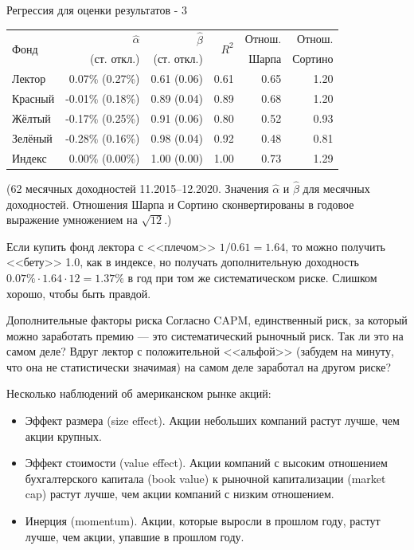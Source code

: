\documentclass{beamer}
\begin{document}
\begin{frame}{Регрессия для оценки результатов - 3}
\center
\begin{tabular}{l|r|r|r|r|r}
\multirow{2}{*}{Фонд}    & $\hat{\alpha}$ & $\hat{\beta}$ & \multirow{2}{*}{$R^2$} & Отнош. & Отнош. \\
& \scriptsize{(ст. откл.)} & \scriptsize{(ст. откл.)} & & Шарпа & Сортино \\ \hline
Лектор  &  0.07\% \scriptsize{(0.27\%)} & 0.61 \scriptsize{(0.06)}   &  0.61 & 0.65 & 1.20 \\
Красный & -0.01\% \scriptsize{(0.18\%)} & 0.89 \scriptsize{(0.04)}   &  0.89 & 0.68 & 1.20 \\
Жёлтый  & -0.17\% \scriptsize{(0.25\%)} & 0.91 \scriptsize{(0.06)}   &  0.80 & 0.52 & 0.93 \\
Зелёный & -0.28\% \scriptsize{(0.16\%)} & 0.98 \scriptsize{(0.04)}   &  0.92 & 0.48 & 0.81 \\ \hline
Индекс  & 0.00\% \scriptsize{(0.00\%)}  & 1.00 \scriptsize{(0.00)}   &  1.00 & 0.73 & 1.29
\end{tabular}
\justify
{\scriptsize(62 месячных доходностей 11.2015--12.2020. Значения $\hat{\alpha}$ и $\hat{\beta}$ для месячных доходностей. Отношения Шарпа и Сортино сконвертированы в годовое выражение умножением на $\sqrt{12}$.)}

\justify
Если купить фонд лектора с <<плечом>> $1/0.61 = 1.64$, то можно получить <<бету>> 1.0, как в индексе, но получать дополнительную доходность $0.07\% \cdot 1.64 \cdot 12 = 1.37\%$ в год при том же систематическом риске. Слишком хорошо, чтобы быть правдой.
\end{frame}



\begin{frame}{Дополнительные факторы риска}
\justify
Согласно CAPM, единственный риск, за который можно заработать премию --- это систематический рыночный риск. Так ли это на самом деле? Вдруг лектор с положительной <<альфой>> (забудем на минуту, что она не статистически значимая) на самом деле заработал на другом риске?

\vspace{\baselineskip}
Несколько наблюдений об американском рынке акций:
\begin{itemize}
\justifying
\item Эффект размера (size effect). Акции небольших компаний растут лучше, чем акции крупных.
\item Эффект стоимости (value effect). Акции компаний с высоким отношением бухгалтерского капитала (book value) к рыночной капитализации (market cap) растут лучше, чем акции компаний с низким отношением.
\item Инерция (momentum). Акции, которые выросли в прошлом году, растут лучше, чем акции, упавшие в прошлом году.
\end{itemize}
\end{frame}
\end{document}
